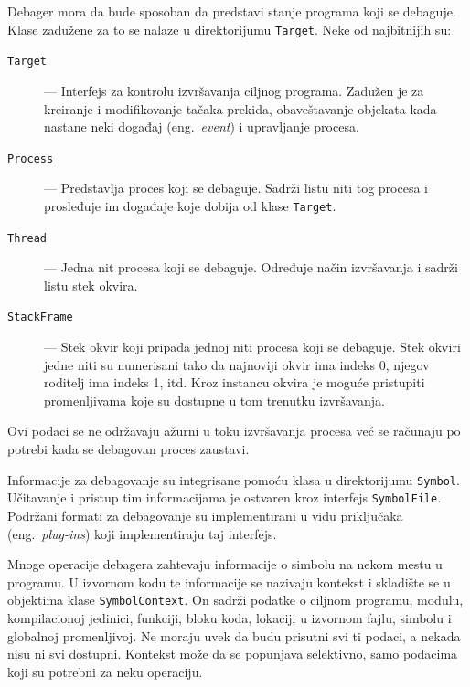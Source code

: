 \documentclass[12pt,oneside]{memoir}
\begin{document}
Debager mora da bude sposoban da predstavi stanje programa koji se debaguje.
Klase zadužene za to se nalaze u direktorijumu \verb|Target|.
Neke od najbitnijih su:
\begin{description}
  \item[\texttt{Target}] --- Interfejs za kontrolu izvršavanja ciljnog programa. Zadužen je za kreiranje i modifikovanje tačaka prekida, obaveštavanje objekata kada nastane neki događaj (eng.~{\em event}) i upravljanje procesa.
  \item[\texttt{Process}] --- Predstavlja proces koji se debaguje. Sadrži listu niti tog procesa i prosleđuje im događaje koje dobija od klase \verb|Target|.
  \item[\texttt{Thread}] --- Jedna nit procesa koji se debaguje. Određuje način izvršavanja i sadrži listu stek okvira.
  \item[\texttt{StackFrame}] --- Stek okvir koji pripada jednoj niti procesa koji se debaguje. Stek okviri jedne niti su numerisani tako da najnoviji okvir ima indeks 0, njegov roditelj ima indeks 1, itd. Kroz instancu okvira je moguće pristupiti promenljivama koje su dostupne u tom trenutku izvršavanja.
\end{description}
Ovi podaci se ne održavaju ažurni u toku izvršavanja procesa već se računaju po potrebi kada se debagovan proces zaustavi.

Informacije za debagovanje su integrisane pomoću klasa u direktorijumu \verb|Symbol|.
Učitavanje i pristup tim informacijama je ostvaren kroz interfejs \verb|SymbolFile|.
Podržani formati za debagovanje su implementirani u vidu priključaka (eng.~{\em plug-ins}) koji implementiraju taj interfejs.

Mnoge operacije debagera zahtevaju informacije o simbolu na nekom mestu u programu.
U izvornom kodu te informacije se nazivaju kontekst i skladište se u objektima klase \verb|SymbolContext|.
On sadrži podatke o ciljnom programu, modulu, kompilacionoj jedinici, funkciji, bloku koda, lokaciji u izvornom fajlu, simbolu i globalnoj promenljivoj.
Ne moraju uvek da budu prisutni svi ti podaci, a nekada nisu ni svi dostupni.
Kontekst može da se popunjava selektivno, samo podacima koji su potrebni za neku operaciju.
\end{document}
